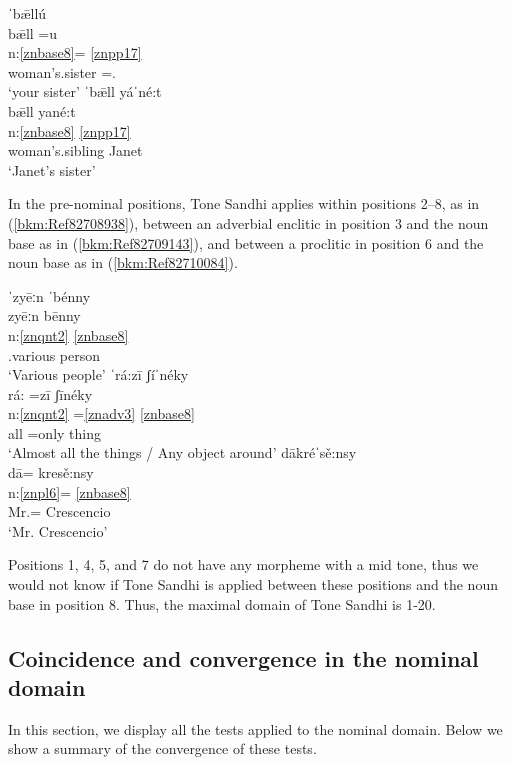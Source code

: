 \documentclass[output=paper]{langscibook}
\begin{document}
\ea\label{ex:key:zap:153}
{ˈb\={æ}llú}\\
\glll b\={æ}ll =u\\
n:\ref{znbase8}=  \ref{znpp17}\\
 woman's.sister =\Second\Sg.\Inf{}\\
\glt `your sister'
\ex\label{ex:key:zap:154}
{ˈb\={æ}ll yáˈné:t}\\
\glll b\={æ}ll yané:t\\
n:\ref{znbase8}   \ref{znpp17}\\
woman's.sibling Janet\\
\glt `Janet's sister'
\z

In the pre-nominal positions, Tone Sandhi applies within positions 2--8, as in (\ref{bkm:Ref82708938}), between an adverbial enclitic in position 3 and the noun base as in (\ref{bkm:Ref82709143}), and between a proclitic in position 6 and the noun base as in (\ref{bkm:Ref82710084}). 

\newpage
\ea\label{bkm:Ref82708938}
{ˈzyēːn ˈbénny}\\
\glll zyēːn bēnny\\
n:\ref{znqnt2} \ref{znbase8}\\
\Qr{}.various person\\
\glt `Various people'
\ex\label{bkm:Ref82709143}
{ˈrá:zī ʃíˈnéky}\\
\glll rá: =zī ʃīnéky\\
n:\ref{znqnt2} =\ref{znadv3} \ref{znbase8} \\
all \textsc{=}only thing\\
\glt `Almost all the things / Any object around'
\ex\label{bkm:Ref82710084}
{dākréˈsě:nsy}\\
\glll dā= kresě:nsy\\
n:\ref{znpl6}= \ref{znbase8}\\
Mr.= Crescencio\\
\glt `Mr. Crescencio'
\z

Positions 1, 4, 5, and 7 do not have any morpheme with a mid tone, thus we would not know if Tone Sandhi is applied between these positions and the noun base in position 8. Thus, the maximal domain of Tone Sandhi is 1-20. 
\subsection{Coincidence and convergence in the nominal domain}

In this section, we display all the tests applied to the nominal domain. Below we show a summary of the convergence of these tests. 
\end{document}

